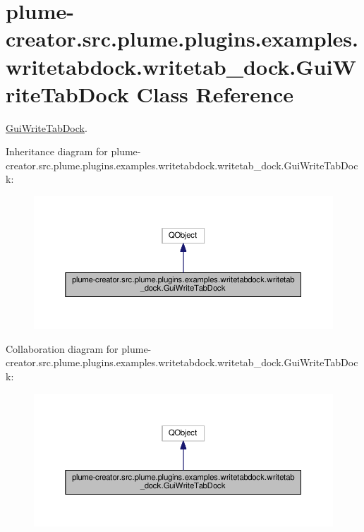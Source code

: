 \hypertarget{classplume-creator_1_1src_1_1plume_1_1plugins_1_1examples_1_1writetabdock_1_1writetab__dock_1_1_gui_write_tab_dock}{}\section{plume-\/creator.src.\+plume.\+plugins.\+examples.\+writetabdock.\+writetab\+\_\+dock.\+Gui\+Write\+Tab\+Dock Class Reference}
\label{classplume-creator_1_1src_1_1plume_1_1plugins_1_1examples_1_1writetabdock_1_1writetab__dock_1_1_gui_write_tab_dock}


\hyperlink{classplume-creator_1_1src_1_1plume_1_1plugins_1_1examples_1_1writetabdock_1_1writetab__dock_1_1_gui_write_tab_dock}{Gui\+Write\+Tab\+Dock}.  




Inheritance diagram for plume-\/creator.src.\+plume.\+plugins.\+examples.\+writetabdock.\+writetab\+\_\+dock.\+Gui\+Write\+Tab\+Dock\+:\nopagebreak
\begin{figure}[H]
\begin{center}
\leavevmode
\includegraphics[width=350pt]{classplume-creator_1_1src_1_1plume_1_1plugins_1_1examples_1_1writetabdock_1_1writetab__dock_1_1_fa876989638f278297e5b1887c7799bc}
\end{center}
\end{figure}


Collaboration diagram for plume-\/creator.src.\+plume.\+plugins.\+examples.\+writetabdock.\+writetab\+\_\+dock.\+Gui\+Write\+Tab\+Dock\+:\nopagebreak
\begin{figure}[H]
\begin{center}
\leavevmode
\includegraphics[width=350pt]{classplume-creator_1_1src_1_1plume_1_1plugins_1_1examples_1_1writetabdock_1_1writetab__dock_1_1_gui_write_tab_dock__coll__graph}
\end{center}
\end{figure}
